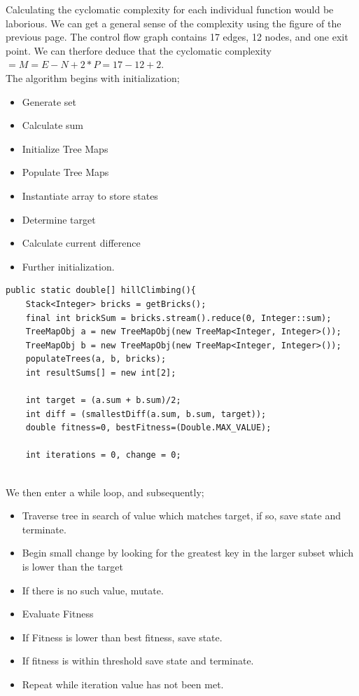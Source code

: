 \documentclass[a4paper]{article}
\begin{document}
\newpage


Calculating the cyclomatic complexity for each individual function would be laborious.
We can get a general sense of the complexity using the figure of the previous page. 
The control flow graph contains 17 edges, 12 nodes, and one exit point.
We can therfore deduce that the cyclomatic complexity
$= M = E - N + 2*P = 17 - 12 +2$. \\


The algorithm begins with initialization; \\
\begin{itemize}
  \item Generate set
  \item Calculate sum
  \item Initialize Tree Maps
  \item Populate Tree Maps
  \item Instantiate array to store states
  \item Determine target 
  \item Calculate current difference 
  \item Further initialization.
\end{itemize} 
\vspace{8mm}

\begin{verbatim}
public static double[] hillClimbing(){
    Stack<Integer> bricks = getBricks();
    final int brickSum = bricks.stream().reduce(0, Integer::sum);
    TreeMapObj a = new TreeMapObj(new TreeMap<Integer, Integer>());
    TreeMapObj b = new TreeMapObj(new TreeMap<Integer, Integer>());
    populateTrees(a, b, bricks);
    int resultSums[] = new int[2];
  
    int target = (a.sum + b.sum)/2;
    int diff = (smallestDiff(a.sum, b.sum, target));
    double fitness=0, bestFitness=(Double.MAX_VALUE);

    int iterations = 0, change = 0;
    

\end{verbatim}


\newpage

\vspace*{-1cm} 
We then enter a while loop, and subsequently;
\vspace{2mm}
\begin{itemize}
  \item Traverse tree in search of value which matches target,
    if so, save state and terminate.
  \item Begin small change by looking for the greatest key in the larger subset 
    which is lower than the target  
  \item If there is no such value, mutate.
  \item Evaluate Fitness
  \item If Fitness is lower than best fitness, save state.
  \item If fitness is within threshold save state and terminate.
  \item Repeat while iteration value has not been met.
  
\end{itemize}
\end{document}
